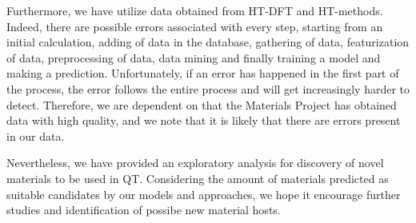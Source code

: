 Furthermore, we have utilize data obtained from HT-DFT and HT-methods. Indeed, there are possible errors associated with every step, starting from an initial calculation, adding of data in the database, gathering of data, featurization of data, preprocessing of data, data mining and finally training a model and making a prediction. Unfortunately, if an error has happened in the first part of the process, the error follows the entire process and will get increasingly harder to detect. Therefore, we are dependent on that the Materials Project has obtained data with high quality, and we note that it is likely that there are errors present in our data. %

Nevertheless, we have provided an exploratory analysis for discovery of novel materials to be used in QT. Considering the amount of materials predicted as suitable candidates by our models and approaches, we hope it encourage further studies and identification of possibe new material hosts.

